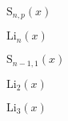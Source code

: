 \documentclass{article}
\begin{document}
$\mathrm{S}_{n,p}(x)$
\pagebreak

$\mathrm{Li}_{n}(x)$
\pagebreak

$\mathrm{S}_{n-1,1}(x)$
\pagebreak

$\mathrm{Li}_{2}(x)$
\pagebreak

$\mathrm{Li}_{3}(x)$
\pagebreak
\end{document}
